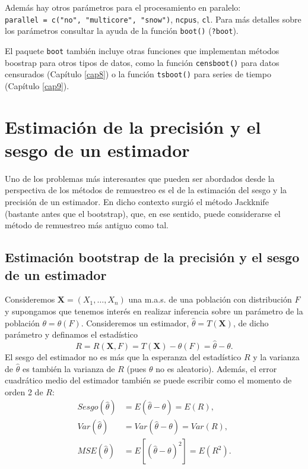\documentclass[
]{book}
\theoremstyle{definition}
\theoremstyle{definition}
\theoremstyle{definition}
\theoremstyle{remark}
\begin{document}
Además hay otros parámetros para el procesamiento en paralelo: \texttt{parallel\ =\ c("no",\ "multicore",\ "snow")}, \texttt{ncpus}, \texttt{cl}. Para más detalles sobre los parámetros
consultar la ayuda de la función \texttt{boot()} (\texttt{?boot}).

El paquete \texttt{boot} también incluye otras funciones que implementan métodos
boostrap para otros tipos de datos, como la función \texttt{censboot()} para datos
censurados (Capítulo \ref{cap8}) o la función \texttt{tsboot()} para series de tiempo (Capítulo \ref{cap9}).

\hypertarget{cap2}{%
\chapter{Estimación de la precisión y el sesgo de un estimador}\label{cap2}}

Uno de los problemas más interesantes que pueden ser abordados desde la
perspectiva de los métodos de remuestreo es el de la estimación del
sesgo y la precisión de un estimador. En dicho contexto surgió el método
Jackknife (bastante antes que el bootstrap), que, en ese sentido, puede
considerarse el método de remuestreo más antiguo como tal.

\hypertarget{cap2-boot}{%
\section{Estimación bootstrap de la precisión y el sesgo de un estimador}\label{cap2-boot}}

Consideremos \(\mathbf{X}=\left( X_1,\ldots ,X_n \right)\) una
m.a.s. de una población con distribución \(F\) y supongamos que tenemos
interés en realizar inferencia sobre un parámetro de la población
\(\theta =\theta \left( F \right)\). Consideremos un estimador,
\(\hat{\theta}=T\left( \mathbf{X} \right)\), de dicho parámetro y
definamos el estadístico
\[R=R\left( \mathbf{X}, F \right) = T\left( \mathbf{X} \right) 
- \theta \left( F \right) = \hat{\theta} - \theta.\]
El sesgo del estimador no es más que la esperanza del
estadístico \(R\) y la varianza de \(\hat{\theta}\) es también la varianza
de \(R\) (pues \(\theta\) no es aleatorio). Además, el error cuadrático
medio del estimador también se puede escribir como el momento de orden 2
de \(R\):
\[\begin{aligned}
Sesgo\left( \hat{\theta} \right) &= E\left( \hat{\theta}-\theta \right)
=E\left( R \right), \\
Var\left( \hat{\theta} \right) &= Var\left( \hat{\theta}-\theta \right)
=Var\left( R \right), \\
MSE\left( \hat{\theta} \right) &= E\left[ \left( \hat{\theta}-\theta \right)
^2\right] =E\left( R^2 \right).
\end{aligned}\]
\end{document}
